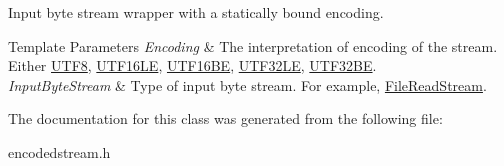 Input byte stream wrapper with a statically bound encoding. 


\begin{DoxyTemplParams}{Template Parameters}
{\em Encoding} & The interpretation of encoding of the stream. Either \hyperlink{a00333}{U\+T\+F8}, \hyperlink{a00329}{U\+T\+F16\+LE}, \hyperlink{a00328}{U\+T\+F16\+BE}, \hyperlink{a00332}{U\+T\+F32\+LE}, \hyperlink{a00331}{U\+T\+F32\+BE}. \\
\hline
{\em Input\+Byte\+Stream} & Type of input byte stream. For example, \hyperlink{a00101}{File\+Read\+Stream}. \\
\hline
\end{DoxyTemplParams}


The documentation for this class was generated from the following file\+:\begin{DoxyCompactItemize}
\item 
encodedstream.\+h\end{DoxyCompactItemize}
